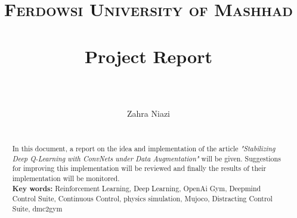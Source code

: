 \documentclass[paper=a4, fontsize=11pt]{scrartcl} %
\title{	
\normalfont \normalsize 
\textsc{Ferdowsi University of Mashhad} \\ [25pt] %
\horrule{0.5pt} \\[0.4cm] %
\huge  Project Report \\ %
\horrule{2pt} \\[0.5cm] %
\date{}
}
\author{Zahra Niazi} %
\theoremstyle{definition}
\begin{document}
\maketitle %
\thispagestyle{empty}

\newpage
\begin{abstract}
{ }\\

In this document, a report on the idea and implementation of the article \textit{"Stabilizing Deep Q-Learning with ConvNets under Data Augmentation"} will be given. Suggestions for improving this implementation will be reviewed and finally the results of their implementation will be monitored. \\

\textbf{Key words:} Reinforcement Learning, Deep Learning, OpenAi Gym, Deepmind Control Suite, Continuous Control, physics simulation, Mujoco, Distracting Control Suite, dmc2gym

\end{abstract}

\newpage
\tableofcontents



















\newpage


\end{document}
